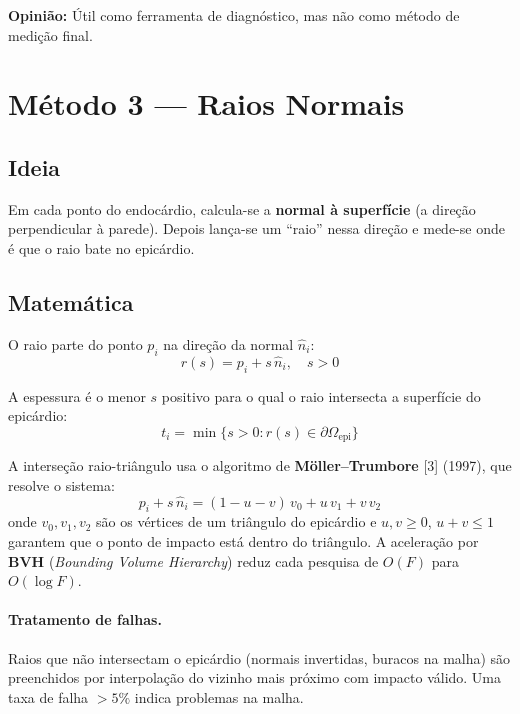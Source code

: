 \documentclass[a4paper,12pt]{article}
\begin{document}
\noindent\textbf{Opinião:} Útil como ferramenta de diagnóstico, mas não como
método de medição final.

\section{Método 3 --- Raios Normais}
\label{sec:rays}

\subsection{Ideia}
Em cada ponto do endocárdio, calcula-se a \textbf{normal à superfície}
(a direção perpendicular à parede). Depois lança-se um ``raio'' nessa
direção e mede-se onde é que o raio bate no epicárdio.

\subsection{Matemática}
O raio parte do ponto $p_i$ na direção da normal $\hat{n}_i$:
\begin{equation}
  r(s) = p_i + s\,\hat{n}_i, \quad s > 0
\end{equation}

A espessura é o menor $s$ positivo para o qual o raio intersecta a
superfície do epicárdio:
\begin{equation}
  t_i = \min\{s > 0 : r(s) \in \partial\Omega_{\text{epi}}\}
\end{equation}

A interseção raio-triângulo usa o algoritmo de \textbf{Möller--Trumbore}
[3] (1997), que resolve o sistema:
\begin{equation}
  p_i + s\,\hat{n}_i = (1-u-v)\,v_0 + u\,v_1 + v\,v_2
\end{equation}
onde $v_0, v_1, v_2$ são os vértices de um triângulo do epicárdio e
$u, v \geq 0$, $u+v \leq 1$ garantem que o ponto de impacto está
dentro do triângulo. A aceleração por \textbf{BVH} (\emph{Bounding
Volume Hierarchy}) reduz cada pesquisa de $O(F)$ para $O(\log F)$.

\paragraph{Tratamento de falhas.}
Raios que não intersectam o epicárdio (normais invertidas, buracos na
malha) são preenchidos por interpolação do vizinho mais próximo com
impacto válido. Uma taxa de falha $> 5\%$ indica problemas na malha.
\end{document}
